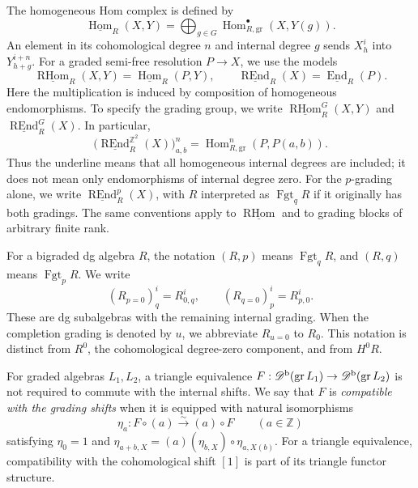 \documentclass[12pt,a4paper,english,reqno]{amsart}
\theoremstyle{plain}
\theoremstyle{definition}
\numberwithin{equation}{section}
\def\Hom{\operatorname{Hom}}
\def\End{\operatorname{End}}
\def\Db{{\mathcal D}^{\text{\rm b}}}
\def\bbZ{{\mathbb Z}}
\def\Ds{\bigoplus}
\newcommand{\Fgt}{\operatorname{Fgt}}
\def\RHom{\operatorname{RHom}}
\def\REnd{\operatorname{REnd}}
\def\gr{\operatorname{gr}}
\newcommand{\uRHom}{\underline{\RHom}}
\newcommand{\uREnd}{\underline{\REnd}}
\begin{document}
The homogeneous Hom complex is defined by
\[
 \underline{\Hom}_R(X,Y)=
 \Ds_{g\in G}\Hom_{R,\mathrm{gr}}^\bullet(X,Y(g)).
\]
An element in its cohomological degree $n$ and internal degree $g$
sends $X^i_h$ into $Y^{i+n}_{h+g}$. For a graded semi-free resolution
$P\to X$, we use the models
\[
 \uRHom_R(X,Y)=\underline{\Hom}_R(P,Y),\qquad
 \uREnd_R(X)=\underline{\End}_R(P).
\]
Here the multiplication is induced by composition of homogeneous
endomorphisms. To specify the grading group, we write
$\uRHom_R^G(X,Y)$ and $\uREnd_R^G(X)$. In particular,
\[
 \bigl(\uREnd_R^{\bbZ^2}(X)\bigr)^n_{a,b}
 =\Hom^n_{R,\mathrm{gr}}(P,P(a,b)).
\]
Thus the underline means that all homogeneous internal degrees are
included; it does not mean only endomorphisms of internal degree zero.
For the $p$-grading alone, we write $\uREnd_R^p(X)$, with $R$
interpreted as $\Fgt_qR$ if it originally has both gradings.
The same conventions apply to $\uRHom$ and to grading blocks of
arbitrary finite rank.

For a bigraded dg algebra $R$, the notation $(R,p)$ means
$\Fgt_qR$, and $(R,q)$ means $\Fgt_pR$. We write
\[
 (R_{p=0})^i_q=R^i_{0,q},\qquad
 (R_{q=0})^i_p=R^i_{p,0}.
\]
These are dg subalgebras with the remaining internal grading.
When the completion grading is denoted by $u$, we abbreviate
$R_{u=0}$ to $R_0$. This notation is distinct from $R^0$, the
cohomological degree-zero component, and from $H^0R$.


For graded algebras $L_1,L_2$, a triangle equivalence
$F:\Db(\gr L_1)\to\Db(\gr L_2)$ is not required to commute
with the internal shifts. We say that $F$ is
\emph{compatible with the grading shifts} when it is equipped
with natural isomorphisms
\[
 \eta_a:F\circ(a)\xrightarrow{\sim}(a)\circ F
 \qquad(a\in\bbZ)
\]
satisfying $\eta_0=1$ and
$\eta_{a+b,X}=(a)(\eta_{b,X})\circ\eta_{a,X(b)}$.
For a triangle equivalence, compatibility with the cohomological
shift $[1]$ is part of its triangle functor structure.
\end{document}
